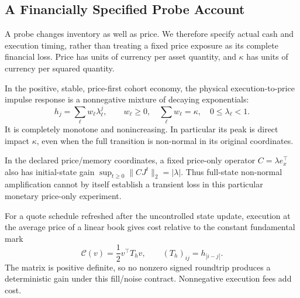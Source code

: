 \subsection{A Financially Specified Probe Account}
\label{sec:capital_frontier}
A probe changes inventory as well as price. We therefore specify actual cash and execution timing, rather than treating a fixed price exposure as its complete financial loss. Price has units of currency per asset quantity, and $\kappa$ has units of currency per squared quantity.

\begin{lemma}
\label{lem:positive_price_kernel}
In the positive, stable, price-first cohort economy, the physical execution-to-price impulse response is a nonnegative mixture of decaying exponentials:
\[
h_j=\sum_\ell w_\ell\lambda_\ell^j,\qquad
w_\ell\ge0,\quad \sum_\ell w_\ell=\kappa,\quad 0\le\lambda_\ell<1.
\]
It is completely monotone and nonincreasing. In particular its peak is direct impact $\kappa$, even when the full transition is non-normal in its original coordinates.

In the declared price/memory coordinates, a fixed price-only operator $C=\lambda e_x^\top$ also has initial-state gain $\sup_{t\ge0}\|CJ^t\|_2=|\lambda|$. Thus full-state non-normal amplification cannot by itself establish a transient loss in this particular monetary price-only experiment.

For a quote schedule refreshed after the uncontrolled state update, execution at the average price of a linear book gives cost relative to the constant fundamental mark
\[
\mathcal C(v)=\frac12v^\top T_hv,\qquad
(T_h)_{ij}=h_{|i-j|}.
\]
The matrix is positive definite, so no nonzero signed roundtrip produces a deterministic gain under this fill/noise contract. Nonnegative execution fees add cost.
\end{lemma}
